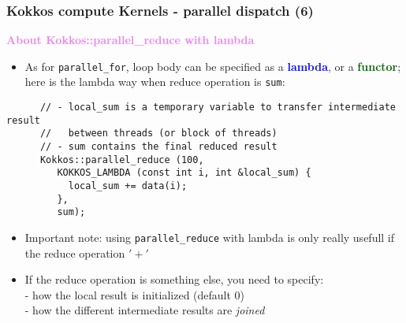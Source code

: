 \begin{frame}[fragile=singleslide]
  \frametitle{Kokkos compute Kernels - parallel dispatch (6)}

  {\large \textcolor{violet}{\textbf{About Kokkos::parallel\_reduce with lambda}}}

  \begin{itemize}
  \item As for \texttt{parallel\_for}, loop body can be specified as a \textcolor{blue}{\bf lambda}, or a \textcolor{darkgreen}{\bf functor}; here is the lambda way when reduce operation is \texttt{sum}:
  \end{itemize}
  {\small
    \begin{verbatim}
      // - local_sum is a temporary variable to transfer intermediate result
      //   between threads (or block of threads)
      // - sum contains the final reduced result
      Kokkos::parallel_reduce (100,
         KOKKOS_LAMBDA (const int i, int &local_sum) {
           local_sum += data(i);
         },
         sum);
       \end{verbatim}
       \begin{itemize}
       \item Important note: using \texttt{parallel\_reduce} with lambda is only really usefull if the reduce operation $'+'$
       \item If the reduce operation is something else, you need to specify:\\
         - how the local result is initialized (default 0)\\
         - how the different intermediate results are {\it joined}
       \end{itemize}
  }
  
\end{frame}
  
